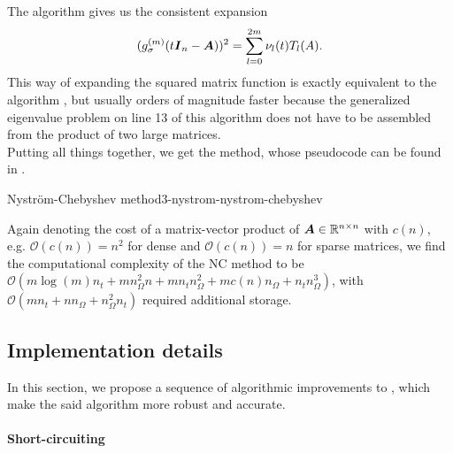 The algorithm gives us the consistent expansion
\begin{equation}
    (g_{\sigma}^{(m)}(t\boldsymbol{I}_n - \boldsymbol{A}))^2 = \sum_{l=0}^{2m} \nu_l(t) T_l(A).
    \label{equ:3-nystrom-consistent-chebyshev-expansion}
\end{equation}
This way of expanding the squared matrix function
is exactly equivalent to the 
algorithm \cite[algorithm~5]{lin2017randomized}, but
usually orders of magnitude faster because the generalized eigenvalue problem
on line 13 of this algorithm does not have to be assembled from the
product of two large matrices.\\


Putting all things together, we get the  method, whose pseudocode
can be found in .
\begin{algo}{Nystr\"om-Chebyshev method}{3-nystrom-nystrom-chebyshev}
    
\end{algo}

Again denoting the cost of a matrix-vector product of $\boldsymbol{A} \in \mathbb{R}^{n \times n}$
with $c(n)$, e.g. $\mathcal{O}(c(n)) = n^2$ for dense and $\mathcal{O}(c(n)) = n$
for sparse matrices, we find the computational complexity of the \gls{NC}
method to be $\mathcal{O}(m \log(m) n_t + m n_{\Omega}^2 n + m n_t n_{\Omega}^2 +  m c(n) n_{\Omega} + n_t n_{\Omega}^3)$, with
$\mathcal{O}(m n_t + n n_{\Omega} + n_{\Omega}^2 n_t)$ required additional storage.


\subsection{Implementation details}
\label{subsec:3-nystrom-implementation-details}

In this section, we propose a sequence of algorithmic improvements to
, which make the said algorithm more
robust and accurate.

\paragraph{Short-circuiting}

